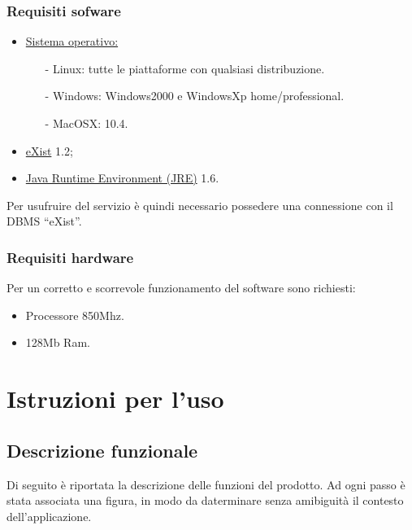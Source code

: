 \subsection{Requisiti sofware}
\begin{itemize}
\item \underline{Sistema operativo:}
\begin{itemize}
\item[-] Linux: tutte le piattaforme con qualsiasi distribuzione.
\item[-] Windows: Windows2000 e WindowsXp home/professional.
\item[-] MacOSX: 10.4.
\end{itemize}
\item \underline{eXist} 1.2;
\item \underline{Java Runtime Environment (JRE)} 1.6.
\end{itemize}
Per usufruire del servizio \`e quindi necessario possedere una connessione con il DBMS ``eXist''.
\subsection{Requisiti hardware}
Per un corretto e scorrevole funzionamento del software sono richiesti:
\begin{itemize}
\item Processore 850Mhz.
\item 128Mb Ram.
\end{itemize}

\chapter{Istruzioni per l'uso}
\section{Descrizione funzionale}
Di seguito \`e riportata la descrizione delle funzioni del prodotto. Ad ogni passo \`e stata associata una figura, in modo da daterminare senza amibiguit\`a il contesto dell'applicazione.
